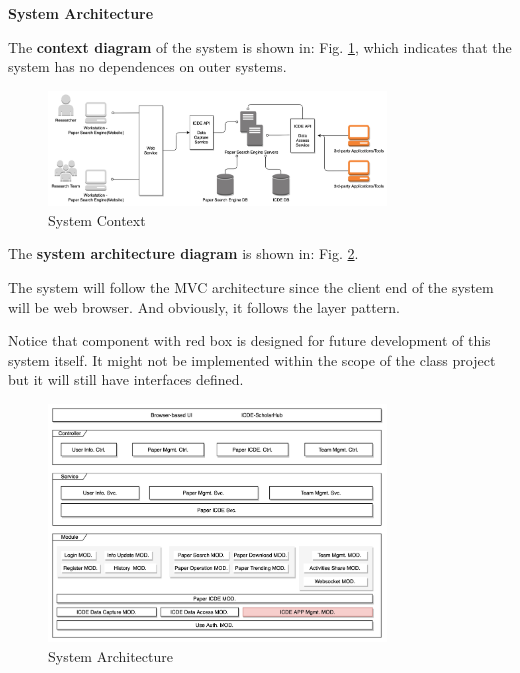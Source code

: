 \textbf{System Architecture}

The \textbf{context diagram} of the system is shown in: Fig. \ref{fig:sys-context}, 
which indicates that the system has no dependences on outer systems.

\begin{figure}[!ht]
	\centering
	\includegraphics[width=0.8\textwidth]{./img/sys-context.png}
	\caption{System Context}
	\label{fig:sys-context}
\end{figure}

The \textbf{system architecture diagram} is shown in: Fig. \ref{fig:sys-arch}.

The system will follow the MVC architecture since the client end of the system will be web browser. 
And obviously, it follows the layer pattern.

Notice that component with red box is designed for future development of this system itself. It might not be implemented within the scope of the class project but it will still have interfaces defined.

\begin{figure}[!ht]
	\centering
	\includegraphics[width=0.8\textwidth]{./img/sys-arch.jpg}
	\caption{System Architecture}
	\label{fig:sys-arch}
\end{figure}